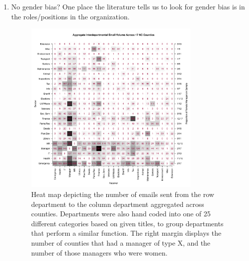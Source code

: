 \documentclass[fleqn]{MJDArticle}
\begin{document}
\begin{enumerate}
	\item No gender bias? One place the literature tells us to look for gender bias is in the roles/positions in the organization.
	
	
	\begin{figure}[H]
	\centering
	\includegraphics[width = 0.8\textwidth]{images/Aggregate_Email_Flows.pdf}
	\caption{\label{fig:heatmaps}Heat map depicting the number of emails sent from the row department to the column department aggregated across counties. Departments were also hand coded into one of 25 different categories based on given titles, to group departments that perform a similar function. The right margin displays the number of counties that had a manager of type X, and the number of those managers who were women.}
	\end{figure}
	

\end{enumerate}
\end{document}
